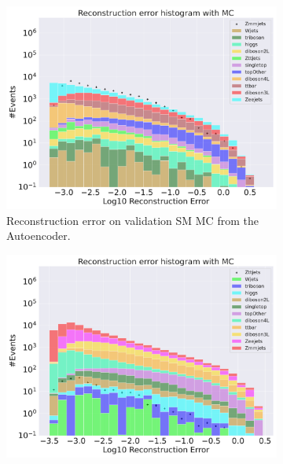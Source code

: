\begin{figure}[h!]
    \centering
    \begin{subfigure}{.8\textwidth}
        \includegraphics[width=\textwidth]{Figures/AE_testing/big/b_data_recon_big_rm3_feats_sig_Zmmjets.pdf}
        \caption{Reconstruction error on validation SM MC from the Autoencoder. }
        \label{fig:ae_big_zmmjets}
    \end{subfigure}
    \hfill
    \begin{subfigure}{.8\textwidth}
        \includegraphics[width=\textwidth]{Figures/AE_testing/big/b_data_recon_big_rm3_feats_sig_Zttjets.pdf}
        \caption{}
        \label{fig:ae_big_zttjets}
    \end{subfigure}
    \hfill        
    \caption{ }
    \label{fig:ae_big_channel6}
\end{figure}
